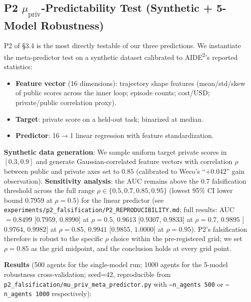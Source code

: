 \documentclass{article}
\theoremstyle{definition}
\begin{document}
\subsection{P2 $\mu_{\text{priv}}$-Predictability Test (Synthetic + 5-Model Robustness)}

P2 of \S3.4 is the most directly testable of our three predictions. We instantiate the meta-predictor test on a synthetic dataset calibrated to AIDE\textsuperscript{2}'s reported statistics:

\begin{itemize}
    \item \textbf{Feature vector} (16 dimensions): trajectory shape features (mean/std/skew of public scores across the inner loop; episode counts; cost/USD; private/public correlation proxy).
    \item \textbf{Target}: private score on a held-out task; binarized at median.
    \item \textbf{Predictor}: 16$\to$1 linear regression with feature standardization.
\end{itemize}

\textbf{Synthetic data generation}: We sample uniform target private scores in $[0.3, 0.9]$ and generate Gaussian-correlated feature vectors with correlation $\rho$ between public and private axes set to 0.85 (calibrated to Weco's ``$+0.042$'' gain observation). \textbf{Sensitivity analysis}: the AUC remains above the 0.7 falsification threshold across the full range $\rho \in \{0.5, 0.7, 0.85, 0.95\}$ (lowest 95\% CI lower bound 0.7959 at $\rho=0.5$) for the linear predictor (see \texttt{experiments/p2\_falsification/P2\_REPRODUCIBILITY.md}; full results: AUC $= 0.8499$ [$0.7959$, $0.8990$] at $\rho=0.5$, $0.9613$ [$0.9307$, $0.9833$] at $\rho=0.7$, $0.9895$ [$0.9764$, $0.9982$] at $\rho=0.85$, $0.9941$ [$0.9855$, $1.0000$] at $\rho=0.95$). P2's falsification therefore is robust to the specific $\rho$ choice within the pre-registered grid; we set $\rho=0.85$ as the grid midpoint, and the conclusion holds at every grid point.

\textbf{Results} (500 agents for the single-model run; 1000 agents for the 5-model robustness cross-validation; seed=42, reproducible from \texttt{p2\_falsification/mu\_priv\_meta\_predictor.py} with \texttt{--n\_agents 500} or \texttt{--n\_agents 1000} respectively):
\end{document}
